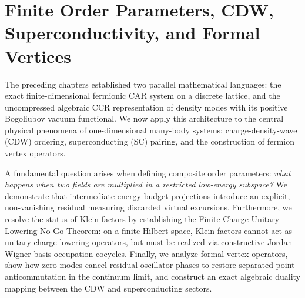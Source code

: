 \chapter[Finite Order Parameters and Formal Vertices]{Finite Order Parameters, CDW, Superconductivity, and Formal Vertices}
\label{ch:order-parameters}

The preceding chapters established two parallel mathematical languages: the exact
finite-dimensional fermionic CAR system on a discrete lattice, and the uncompressed
algebraic CCR representation of density modes with its positive Bogoliubov vacuum functional.
We now apply this architecture to the central physical phenomena of one-dimensional
many-body systems: charge-density-wave (CDW) ordering, superconducting (SC) pairing,
and the construction of fermion vertex operators.

A fundamental question arises when defining composite order parameters:
\emph{what happens when two fields are multiplied in a restricted low-energy subspace?}
We demonstrate that intermediate energy-budget projections introduce an explicit,
non-vanishing residual measuring discarded virtual excursions.  Furthermore, we resolve
the status of Klein factors by establishing the Finite-Charge Unitary Lowering No-Go Theorem:
on a finite Hilbert space, Klein factors cannot act as unitary charge-lowering operators,
but must be realized via constructive Jordan--Wigner basis-occupation cocycles.
Finally, we analyze formal vertex operators, show how zero modes cancel residual oscillator
phases to restore separated-point anticommutation in the continuum limit, and construct an
exact algebraic duality mapping between the CDW and superconducting sectors.





